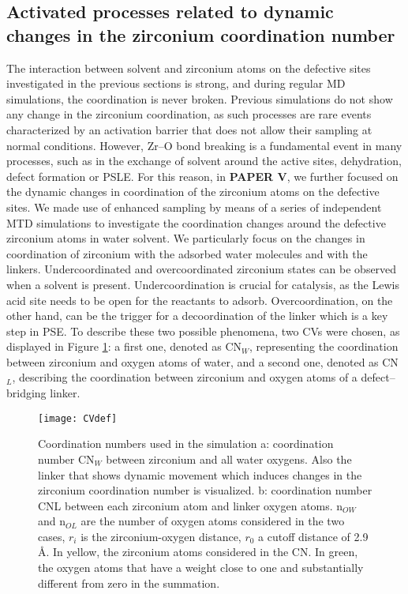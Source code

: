 \subsection*{Activated processes related to dynamic changes in the zirconium coordination number}
The interaction between solvent and zirconium atoms on the defective sites investigated in the previous sections is strong, and during regular MD simulations, the coordination is never broken. Previous simulations do not show any change in the zirconium coordination, as such processes are rare events characterized by an activation barrier that does not allow their sampling at normal conditions. However, Zr--O bond breaking is a fundamental event in many processes, such as in the exchange of solvent around the active sites, dehydration, defect formation or PSLE. For this reason, in \textbf{PAPER V}, we further focused on the dynamic changes in coordination of the zirconium atoms on the defective sites. We made use of enhanced sampling by means of a series of independent MTD simulations to investigate the coordination changes around the defective zirconium atoms in water solvent. 
\npar
We particularly focus on the changes in coordination of zirconium with the adsorbed water molecules and with the linkers. Undercoordinated and overcoordinated zirconium states can be observed when a solvent is present. Undercoordination is crucial for catalysis, as the Lewis acid site needs to be open for the reactants to adsorb. Overcoordination, on the other hand, can be the trigger for a decoordination of the linker which is a key step in PSE.
\npar
To describe these two possible phenomena, two CVs were chosen, as displayed in Figure \ref{fig:CVdef}: a first one, denoted as CN$_W$, representing the coordination between zirconium and oxygen atoms of water, and a second one, denoted as CN$_L$, describing the coordination between zirconium and oxygen atoms of a defect--bridging linker.
\npar
\begin{figure}[!htb]
	\centering
	\texttt{[image: CVdef]}
	\caption{Coordination numbers used in the simulation a: coordination number CN$_W$ between zirconium and all water oxygens. Also the linker that shows dynamic movement which induces changes in the zirconium coordination number is visualized. b: coordination number CNL between each zirconium atom and linker oxygen atoms. n$_{OW}$ and n$_{OL}$ are the number of oxygen atoms considered in the two cases, $r_i$ is the zirconium-oxygen distance, $r_0$ a cutoff distance of 2.9 \AA. In yellow, the zirconium atoms considered in the CN. In green, the oxygen atoms that have a weight close to one and substantially different from zero in the summation.}
	\label{fig:CVdef}
\end{figure}
